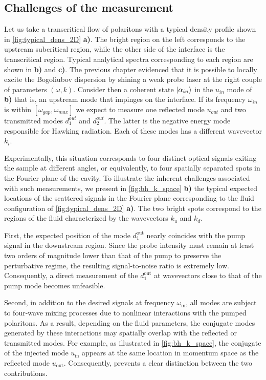 \subsection{Challenges of the measurement}


Let us take a transcritical flow of polaritons with a typical density profile shown in \autoref{fig:typical_dens_2D} \textbf{a)}. The bright
region on the left corresponds to the upstream subcritical region, while the other side of the interface is the transcritical region. Typical analytical spectra corresponding to each region are shown in \textbf{b)} and \textbf{c)}.
The previous chapter evidenced that it is possible to locally excite the Bogoliubov dispersion by shining a weak probe laser at the right couple of parameters $(\omega, k)$. Consider then a coherent state
$\ket{\alpha_{in}}$ in the $u_{in}$ mode of \textbf{b)} that is, an upstream mode that impinges on the interface. If its frequency $\omega_{in}$ is within $[\omega_{gap}, \omega_{max}]$ we expect to measure one reflected mode $u_{out}$ and two transmitted modes $d_1^{out}$ and $d_2^{out}$. The latter is the negative
energy mode responsible for Hawking radiation. Each of these modes has a different wavevector $k_i$.

\bigskip


Experimentally, this situation corresponds to four distinct optical signals exiting the sample at different angles, or equivalently, to four spatially separated spots in the Fourier plane of the cavity. To illustrate the inherent challenges associated with such measurements, we present in \autoref{fig:bh_k_space} \textbf{b)} the typical expected locations of the scattered signals in the Fourier plane corresponding to the fluid configuration of \autoref{fig:typical_dens_2D} \textbf{a)}. The two bright spots correspond to the regions of the fluid characterized by the wavevectors \(k_u\) and \(k_d\). 

First, the expected position of the mode \(d_1^{\text{out}}\) nearly coincides with the pump signal in the downstream region. Since the probe intensity must remain at least two orders of magnitude lower than that of the pump to preserve the perturbative regime, the resulting signal-to-noise ratio is extremely low. Consequently, a direct measurement of the \(d_1^{\text{out}}\) at wavevectors close to that of the pump mode becomes unfeasible.

Second, in addition to the desired signals at frequency \(\omega_{\text{in}}\), all modes are subject to four-wave mixing processes due to nonlinear interactions with the pumped polaritons. As a result, depending on the fluid parameters, the conjugate modes generated by these interactions may spatially overlap with the reflected or transmitted modes. For example, as illustrated in \autoref{fig:bh_k_space}, the conjugate of the injected mode \(u_{\text{in}}\) appears at the same location in momentum space as the reflected mode \(u_{\text{out}}\). Consequently, prevents a clear distinction between the two contributions.

